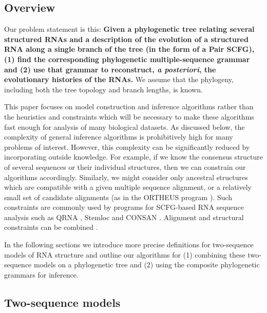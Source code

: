 \documentclass[10pt]{article}
\begin{document}
\subsection*{Overview}

Our problem statement is this:
\textbf{Given a phylogenetic tree relating several structured RNAs and a
  description of the evolution of a structured RNA
  along a single branch of the tree (in the form of a Pair SCFG),
  (1) find the corresponding
  phylogenetic multiple-sequence grammar and (2) use that grammar to
  reconstruct, {\em a posteriori}, the evolutionary histories of the
  RNAs.}
We assume that the phylogeny, including both the tree topology and
branch lengths, is known.

This paper focuses on model construction and inference algorithms
rather than the heuristics and constraints which will be necessary to make these
algorithms fast enough for analysis of many biological datasets.
As discussed below, the complexity of general inference algorithms is
prohibitively high for many problems of interest.
However, this complexity can be significantly
reduced by incorporating outside knowledge.  For example, if we know
the consensus structure of several sequences or their individual
structures, then we can constrain our algorithms accordingly.
Similarly, we might consider only ancestral structures which are
compatible with a given multiple sequence alignment, or a relatively small set of candidate alignments (as in the ORTHEUS program \cite{PatenHolmesBirney2008}). 
Such constraints are
commonly used by programs for SCFG-based RNA sequence analysis such as QRNA \cite{RivasEddy2001}, Stemloc \cite{Holmes2005} and CONSAN \cite{DowellEddy2006}.
Alignment and structural constraints can be combined \cite{Holmes2005}.


In the following sections we introduce more precise definitions for two-sequence
models of RNA structure and outline our algorithms for
(1) combining these two-sequence models on a phylogenetic tree and
(2) using the composite phylogenetic grammars for inference.



\subsection*{Two-sequence models} 
\end{document}
